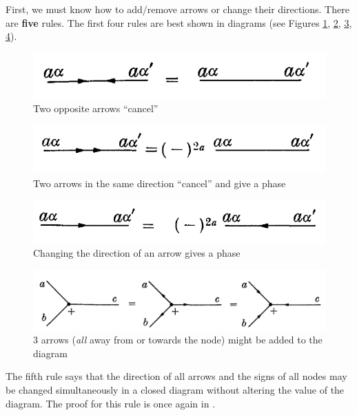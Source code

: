 \documentclass[11pt]{article}
\begin{document}
First, we must know how to add/remove arrows or change their directions. There are \textbf{five} rules. The first four rules are best shown in diagrams (see Figures \ref{fig:arrow1}, \ref{fig:arrow2}, \ref{fig:arrow3}, \ref{fig:arrow4}). 
	\begin{figure}[!htb]
		\centering
		\includegraphics[scale=0.7]{arrow_1}
		\caption{Two opposite arrows ``cancel'' \cite{angular_momentum}}
		\label{fig:arrow1}
	\end{figure}	
	\begin{figure}[!htb]
		\centering
		\includegraphics[scale=0.7]{arrow_2}
		\caption{Two arrows in the same direction  ``cancel'' and give a phase  \cite{angular_momentum}}
		\label{fig:arrow2}
	\end{figure}
	\begin{figure}[!htb]
		\centering
		\includegraphics[scale=0.7]{arrow_3}
		\caption{Changing the direction of an arrow gives a phase \cite{angular_momentum}}
		\label{fig:arrow3}
	\end{figure}
	\begin{figure}[!htb]
		\centering
		\includegraphics[scale=0.7]{arrow_4}
		\caption{3 arrows (\textit{all} away from or towards the node) might be added to the diagram  \cite{angular_momentum}}
		\label{fig:arrow4}
	\end{figure}
The fifth rule says that the direction of all arrows and the signs of all nodes may be changed simultaneously in a closed diagram without altering the value of the diagram. The proof for this rule is once again in \cite{angular_momentum}. 
\end{document}

